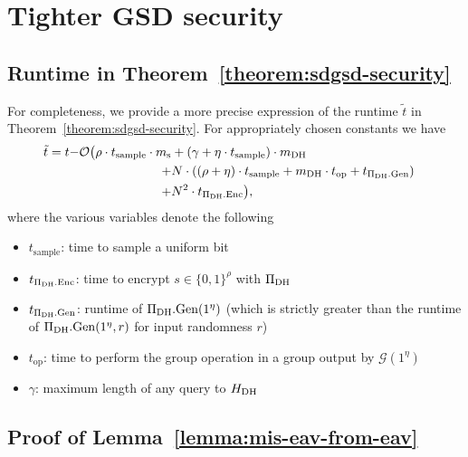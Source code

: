 \section{Tighter GSD security}

\subsection{Runtime in Theorem~\ref{theorem:sdgsd-security}} \label{sec:sdgsd-security-runtime}

For completeness, we provide a more precise expression of the runtime $\tilde{t}$ in Theorem~\ref{theorem:sdgsd-security}. For appropriately chosen constants we have
\[
	\tilde{t} = t \begin{aligned}[t]
		- & \mathcal{O}
		\begin{aligned}[t]
			\big(\rho \cdot t_{\mathrm{sample}} \cdot m_\mathrm{s} & + (\gamma + \eta \cdot t_{\mathrm{sample}}) \cdot m_\mathrm{DH} \\ + & N \cdot ((\rho + \eta) \cdot t_{\mathrm{sample}} + m_\mathrm{DH} \cdot t_{\mathrm{op}} + t_{\Pi_{\mathrm{DH}}.\mathrm{Gen}})  \\ + & N^2 \cdot t_{\Pi_{\mathrm{DH}}.\mathrm{Enc}}\big), \\
		\end{aligned}
	\end{aligned}
\]
where the various variables denote the following
\begin{itemize}
	\item $t_{\mathrm{sample}}$: time to sample a uniform bit
	\item $t_{\Pi_{\mathrm{DH}}.\mathrm{Enc}}$: time to encrypt $s \in \{0, 1\}^\rho$ with $\Pi_{\mathrm{DH}}$
	\item $t_{\Pi_{\mathrm{DH}}.\mathrm{Gen}}$: runtime of $\Pi_{\mathrm{DH}}.\mathrm{Gen}(1^\eta)$ (which is strictly greater than the runtime of $\Pi_{\mathrm{DH}}.\mathrm{Gen}(1^\eta, r)$ for input randomness $r$)
	\item $t_{\mathrm{op}}$: time to perform the group operation in a group output by $\mathcal{G}(1^\eta)$
	\item $\gamma$: maximum length of any query to $H_\mathrm{DH}$
\end{itemize}

\subsection{Proof of Lemma~\ref{lemma:mis-eav-from-eav}} \label{sec:mis-eav-from-eav-proof}

